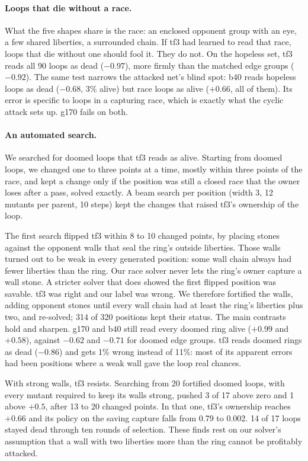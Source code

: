 \documentclass[11pt]{article}
\newcommand{\pos}[1]{$+#1$}
\newcommand{\nega}[1]{$-#1$}
\begin{document}
\paragraph{Loops that die without a race.} What the five shapes share is the race: an enclosed opponent group with an eye, a few shared liberties, a surrounded chain. If tf3 had learned to read that race, loops that die without one should fool it. They do not. On the hopeless set, tf3 reads all 90 loops as dead (\nega{0.97}), more firmly than the matched edge groups (\nega{0.92}). The same test narrows the attacked net's blind spot: b40 reads hopeless loops as dead (\nega{0.68}, 3\% alive) but race loops as alive (\pos{0.66}, all of them). Its error is specific to loops in a capturing race, which is exactly what the cyclic attack sets up. g170 fails on both.

\paragraph{An automated search.} \label{sec:walls}
We searched for doomed loops that tf3 reads as alive. Starting from doomed loops, we changed one to three points at a time, mostly within three points of the race, and kept a change only if the position was still a closed race that the owner loses after a pass, solved exactly. A beam search per position (width 3, 12 mutants per parent, 10 steps) kept the changes that raised tf3's ownership of the loop.

The first search flipped tf3 within 8 to 10 changed points, by placing stones against the opponent walls that seal the ring's outside liberties. Those walls turned out to be weak in every generated position: some wall chain always had fewer liberties than the ring. Our race solver never lets the ring's owner capture a wall stone. A stricter solver that does showed the first flipped position was savable. tf3 was right and our label was wrong. We therefore fortified the walls, adding opponent stones until every wall chain had at least the ring's liberties plus two, and re-solved; 314 of 320 positions kept their status. The main contrasts hold and sharpen. g170 and b40 still read every doomed ring alive (\pos{0.99} and \pos{0.58}), against \nega{0.62} and \nega{0.71} for doomed edge groups. tf3 reads doomed rings as dead (\nega{0.86}) and gets 1\% wrong instead of 11\%: most of its apparent errors had been positions where a weak wall gave the loop real chances.

With strong walls, tf3 resists. Searching from 20 fortified doomed loops, with every mutant required to keep its walls strong, pushed 3 of 17 above zero and 1 above \pos{0.5}, after 13 to 20 changed points. In that one, tf3's ownership reaches \pos{0.66} and its policy on the saving capture falls from 0.79 to 0.002. 14 of 17 loops stayed dead through ten rounds of selection. These finds rest on our solver's assumption that a wall with two liberties more than the ring cannot be profitably attacked.
\end{document}
